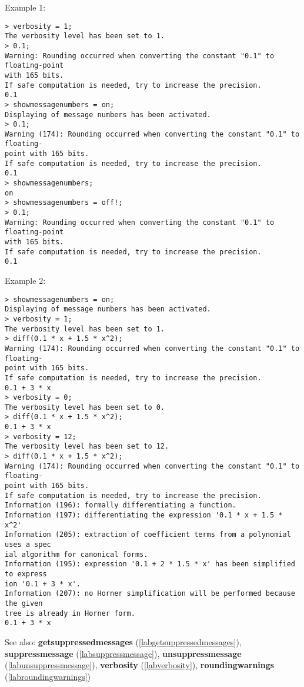 \noindent Example 1: 
\begin{center}\begin{minipage}{15cm}\begin{Verbatim}[frame=single]
> verbosity = 1;
The verbosity level has been set to 1.
> 0.1;
Warning: Rounding occurred when converting the constant "0.1" to floating-point 
with 165 bits.
If safe computation is needed, try to increase the precision.
0.1
> showmessagenumbers = on;
Displaying of message numbers has been activated.
> 0.1;
Warning (174): Rounding occurred when converting the constant "0.1" to floating-
point with 165 bits.
If safe computation is needed, try to increase the precision.
0.1
> showmessagenumbers;
on
> showmessagenumbers = off!;
> 0.1;
Warning: Rounding occurred when converting the constant "0.1" to floating-point 
with 165 bits.
If safe computation is needed, try to increase the precision.
0.1
\end{Verbatim}
\end{minipage}\end{center}
\noindent Example 2: 
\begin{center}\begin{minipage}{15cm}\begin{Verbatim}[frame=single]
> showmessagenumbers = on;
Displaying of message numbers has been activated.
> verbosity = 1;
The verbosity level has been set to 1.
> diff(0.1 * x + 1.5 * x^2);
Warning (174): Rounding occurred when converting the constant "0.1" to floating-
point with 165 bits.
If safe computation is needed, try to increase the precision.
0.1 + 3 * x
> verbosity = 0;
The verbosity level has been set to 0.
> diff(0.1 * x + 1.5 * x^2);
0.1 + 3 * x
> verbosity = 12;
The verbosity level has been set to 12.
> diff(0.1 * x + 1.5 * x^2);
Warning (174): Rounding occurred when converting the constant "0.1" to floating-
point with 165 bits.
If safe computation is needed, try to increase the precision.
Information (196): formally differentiating a function.
Information (197): differentiating the expression '0.1 * x + 1.5 * x^2'
Information (205): extraction of coefficient terms from a polynomial uses a spec
ial algorithm for canonical forms.
Information (195): expression '0.1 + 2 * 1.5 * x' has been simplified to express
ion '0.1 + 3 * x'.
Information (207): no Horner simplification will be performed because the given 
tree is already in Horner form.
0.1 + 3 * x
\end{Verbatim}
\end{minipage}\end{center}
See also: \textbf{getsuppressedmessages} (\ref{labgetsuppressedmessages}), \textbf{suppressmessage} (\ref{labsuppressmessage}), \textbf{unsuppressmessage} (\ref{labunsuppressmessage}), \textbf{verbosity} (\ref{labverbosity}), \textbf{roundingwarnings} (\ref{labroundingwarnings})
